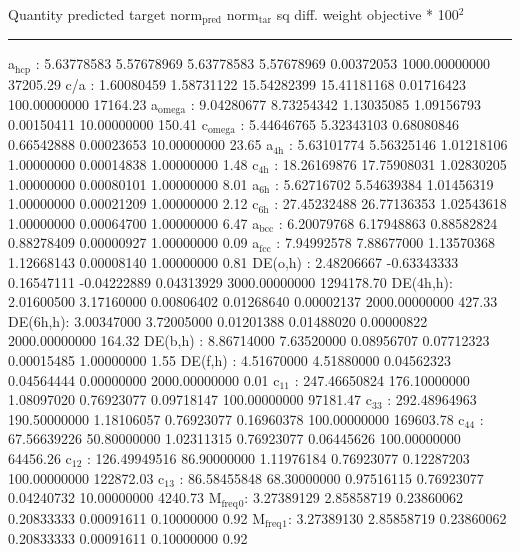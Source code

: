 \documentclass[11pt]{article}
\begin{document}
Quantity      predicted    target     norm\(_{\text{pred}}\)   norm\(_{\text{tar}}\)    sq diff.      weight    objective * 100\(^{\text{2}}\) 

\noindent\rule{\textwidth}{0.5pt}
a\(_{\text{hcp}}\)   :   5.63778583   5.57678969   5.63778583   5.57678969   0.00372053 1000.00000000     37205.29
c/a     :   1.60080459   1.58731122  15.54282399  15.41181168   0.01716423 100.00000000     17164.23
a\(_{\text{omega}}\) :   9.04280677   8.73254342   1.13035085   1.09156793   0.00150411  10.00000000       150.41
c\(_{\text{omega}}\) :   5.44646765   5.32343103   0.68080846   0.66542888   0.00023653  10.00000000        23.65
a\(_{\text{4h}}\)    :   5.63101774   5.56325146   1.01218106   1.00000000   0.00014838   1.00000000         1.48
c\(_{\text{4h}}\)    :  18.26169876  17.75908031   1.02830205   1.00000000   0.00080101   1.00000000         8.01
a\(_{\text{6h}}\)    :   5.62716702   5.54639384   1.01456319   1.00000000   0.00021209   1.00000000         2.12
c\(_{\text{6h}}\)    :  27.45232488  26.77136353   1.02543618   1.00000000   0.00064700   1.00000000         6.47
a\(_{\text{bcc}}\)   :   6.20079768   6.17948863   0.88582824   0.88278409   0.00000927   1.00000000         0.09
a\(_{\text{fcc}}\)   :   7.94992578   7.88677000   1.13570368   1.12668143   0.00008140   1.00000000         0.81
DE(o,h) :   2.48206667  -0.63343333   0.16547111  -0.04222889   0.04313929 3000.00000000   1294178.70
DE(4h,h):   2.01600500   3.17160000   0.00806402   0.01268640   0.00002137 2000.00000000       427.33
DE(6h,h):   3.00347000   3.72005000   0.01201388   0.01488020   0.00000822 2000.00000000       164.32
DE(b,h) :   8.86714000   7.63520000   0.08956707   0.07712323   0.00015485   1.00000000         1.55
DE(f,h) :   4.51670000   4.51880000   0.04562323   0.04564444   0.00000000 2000.00000000         0.01
c\(_{\text{11}}\)    : 247.46650824 176.10000000   1.08097020   0.76923077   0.09718147 100.00000000     97181.47
c\(_{\text{33}}\)    : 292.48964963 190.50000000   1.18106057   0.76923077   0.16960378 100.00000000    169603.78
c\(_{\text{44}}\)    :  67.56639226  50.80000000   1.02311315   0.76923077   0.06445626 100.00000000     64456.26
c\(_{\text{12}}\)    : 126.49949516  86.90000000   1.11976184   0.76923077   0.12287203 100.00000000    122872.03
c\(_{\text{13}}\)    :  86.58455848  68.30000000   0.97516115   0.76923077   0.04240732  10.00000000      4240.73
M\(_{\text{freq}}\)\(_{\text{0}}\):   3.27389129   2.85858719   0.23860062   0.20833333   0.00091611   0.10000000         0.92
M\(_{\text{freq}}\)\(_{\text{1}}\):   3.27389130   2.85858719   0.23860062   0.20833333   0.00091611   0.10000000         0.92
\end{document}
